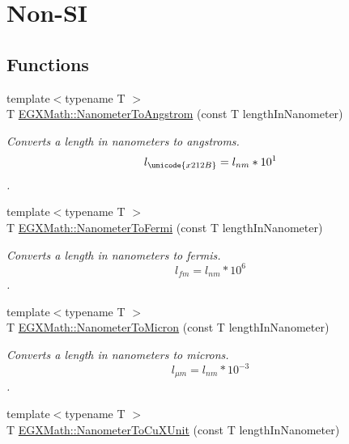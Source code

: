 \hypertarget{group___e_g_x_math-_conversions-_length_conversions-_nanometer-_non-_s_i}{}\section{Non-\/\+SI}
\label{group___e_g_x_math-_conversions-_length_conversions-_nanometer-_non-_s_i}
\subsection*{Functions}
\begin{DoxyCompactItemize}
\item 
{\footnotesize template$<$typename T $>$ }\\T \mbox{\hyperlink{group___e_g_x_math-_conversions-_length_conversions-_nanometer-_non-_s_i_ga7e2062d4cc1a422e54da597c4413efb1}{E\+G\+X\+Math\+::\+Nanometer\+To\+Angstrom}} (const T length\+In\+Nanometer)
\begin{DoxyCompactList}\small\item\em Converts a length in nanometers to angstroms. \[ l_{\unicode{x212B}}=l_{nm} * 10^{1} \]. \end{DoxyCompactList}\item 
{\footnotesize template$<$typename T $>$ }\\T \mbox{\hyperlink{group___e_g_x_math-_conversions-_length_conversions-_nanometer-_non-_s_i_ga9b708f83b519464f5ebb912bcaaf747d}{E\+G\+X\+Math\+::\+Nanometer\+To\+Fermi}} (const T length\+In\+Nanometer)
\begin{DoxyCompactList}\small\item\em Converts a length in nanometers to fermis. \[ l_{fm}=l_{nm} * 10^{6} \]. \end{DoxyCompactList}\item 
{\footnotesize template$<$typename T $>$ }\\T \mbox{\hyperlink{group___e_g_x_math-_conversions-_length_conversions-_nanometer-_non-_s_i_ga278b008cafd5027568e16cbc8af7fb6a}{E\+G\+X\+Math\+::\+Nanometer\+To\+Micron}} (const T length\+In\+Nanometer)
\begin{DoxyCompactList}\small\item\em Converts a length in nanometers to microns. \[ l_{\mu m}=l_{nm} * 10^{-3} \]. \end{DoxyCompactList}\item 
{\footnotesize template$<$typename T $>$ }\\T \mbox{\hyperlink{group___e_g_x_math-_conversions-_length_conversions-_nanometer-_non-_s_i_ga59399657caa5a9c81df2ffbe1ff7683c}{E\+G\+X\+Math\+::\+Nanometer\+To\+Cu\+X\+Unit}} (const T length\+In\+Nanometer)

\end{DoxyCompactItemize}
